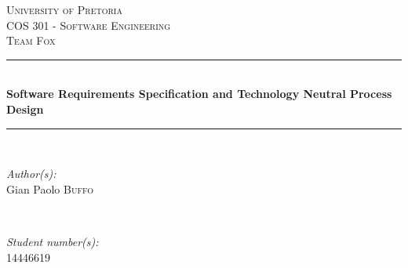 \documentclass[a4paper,12pt]{article}
\begin{document}
\begin{titlepage}

\newcommand{\HRule}{\rule{\linewidth}{0.5mm}} %

\center %
 

\textsc{\LARGE University of Pretoria}\\[1.5cm] %
\textsc{\Large COS 301 - Software Engineering}\\[0.5cm] %
\textsc{\large Team Fox}\\[0.5cm] %


\HRule \\[0.4cm]
{ \huge \bfseries Software Requirements Specification and Technology Neutral Process Design}\\[0.4cm] %
\HRule \\[1.5cm]
 

\begin{minipage}{0.4\textwidth}
\begin{flushleft} \large
\emph{Author(s):}\\
Gian Paolo \textsc{Buffo} %
\end{flushleft}
\end{minipage}
~
\begin{minipage}{0.4\textwidth}
\begin{flushright} \large
\emph{Student number(s):} \\
14446619 %
\end{flushright}
\end{minipage}\\[4cm]



\end{titlepage}
\end{document}
